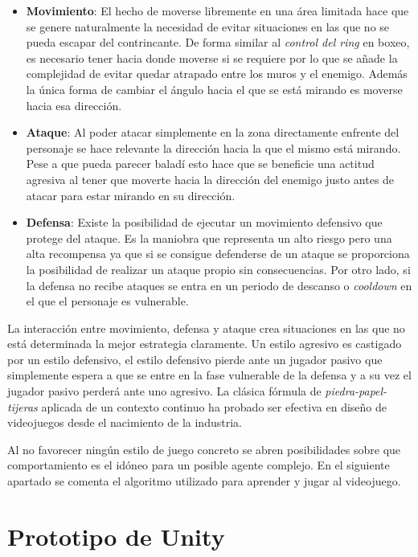 \begin{itemize}
	\item \textbf{Movimiento}: El hecho de moverse libremente en una área limitada hace que se genere naturalmente la necesidad de evitar situaciones en las que no se pueda escapar del contrincante. De forma similar al \textit{control del ring} en boxeo, es necesario tener hacia donde moverse si se requiere por lo que se añade la complejidad de evitar quedar atrapado entre los muros y el enemigo. Además la única forma de cambiar el ángulo hacia el que se está mirando es moverse hacia esa dirección.
	\item \textbf{Ataque}: Al poder atacar simplemente en la zona directamente enfrente del personaje se hace relevante la dirección hacia la que el mismo está mirando. Pese a que pueda parecer baladí esto hace que se beneficie una actitud agresiva al tener que moverte hacia la dirección del enemigo justo antes de atacar para estar mirando en su dirección.
	\item \textbf{Defensa}: Existe la posibilidad de ejecutar un movimiento defensivo que protege del ataque. Es la maniobra que representa un alto riesgo pero una alta recompensa ya que si se consigue defenderse de un ataque se proporciona la posibilidad de realizar un ataque propio sin consecuencias. Por otro lado, si la defensa no recibe ataques se entra en un periodo de descanso o \textit{cooldown} en el que el personaje es vulnerable.
\end{itemize}

\bigskip

La interacción entre movimiento, defensa y ataque crea situaciones en las que no está determinada la mejor estrategia claramente. Un estilo agresivo es castigado por un estilo defensivo, el estilo defensivo pierde ante un jugador pasivo que simplemente espera a que se entre en la fase vulnerable de la defensa y a su vez el jugador pasivo perderá ante uno agresivo. La clásica fórmula de \textit{piedra-papel-tijeras} aplicada de un contexto continuo ha probado ser efectiva en diseño de videojuegos desde el nacimiento de la industria.

\bigskip

Al no favorecer ningún estilo de juego concreto se abren posibilidades sobre que comportamiento es el idóneo para un posible agente complejo. En el siguiente apartado se comenta el algoritmo utilizado para aprender y jugar al videojuego.

\section{Prototipo de Unity}

